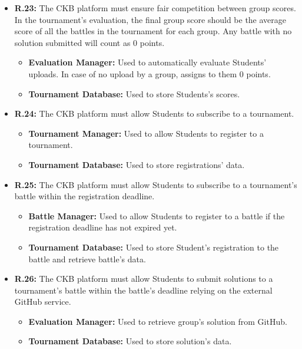 \documentclass{article}
\begin{document}
{\begin{itemize}
    \item \textbf{R.23:} The CKB platform must ensure fair competition between group scores. In the tournament's evaluation, the final
          group score should be the average score of all the battles in the tournament for each group. Any battle with no solution submitted will count
          as 0 points.
          \begin{itemize}
            \item \textbf{Evaluation Manager:} Used to automatically evaluate Students' uploads.
            In case of no upload by a group, assigns to them 0 points.
            \item \textbf{Tournament Database:} Used to store Students's scores.
          \end{itemize}
    \item \textbf{R.24:} The CKB platform must allow Students to subscribe to a tournament.
          \begin{itemize}
              \item \textbf{Tournament Manager:} Used to allow Students to register to a tournament.
              \item \textbf{Tournament Database:} Used to store registrations' data.
          \end{itemize}
    \item \textbf{R.25:} The CKB platform must allow Students to subscribe to a tournament's battle
          within the registration deadline.
          \begin{itemize}
              \item \textbf{Battle Manager:} Used to allow Students to register to a battle if the
              registration deadline has not expired yet.
              \item \textbf{Tournament Database:} Used to store Student's registration to the battle
              and retrieve battle's data.
          \end{itemize}
    \item \textbf{R.26:} The CKB platform must allow Students to submit solutions to a tournament's battle
        within the battle's deadline relying on the external GitHub service.
          \begin{itemize}
              \item \textbf{Evaluation Manager:} Used to retrieve group's solution from GitHub.
              \item \textbf{Tournament Database:} Used to store solution's data.
          \end{itemize}

\end{itemize}}
\end{document}
